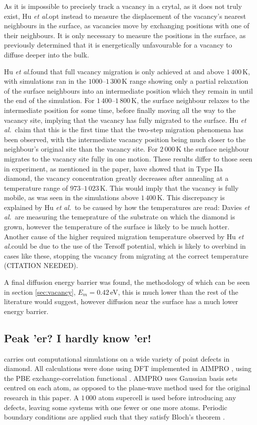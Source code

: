 \documentclass[10pt,a4paper,twocolumn,twoside]{extarticle}
\newcommand{\al}{\emph{et al.}}
\begin{document}
As it is impossible to precisely track a vacancy in a crytal, as it does not truly exist, Hu \al opt instead to measure the displacement of the vacancy's nearest neighbours in the surface, as vacancies move by exchanging positions with one of their neighbours. It is only necessary to measure the positions in the surface, as \textcite{Halicioglu} previously determined that it is energetically unfavourable for a vacancy to diffuse deeper into the bulk. 

Hu \al found that full vacancy migration is only achieved at and above $1\,400$\,K, with simulations ran in the $1000$--$1\,300$\,K range showing only a partial relaxation of the surface neighbours into an intermediate position which they remain in until the end of the simulation. For $1\,400$--$1\,800$\,K, the surface neighbour relaxes to the intermediate position for some time, before finally moving all the way to the vacancy site, implying that the vacancy has fully migrated to the surface. Hu \al~claim that this is the first time that the two-step migration phenomena has been observed, with the intermediate vacancy position being much closer to the neighbour's original site than the vacancy site. For $2\,000$\,K the surface neighbour migrates to the vacancy site fully in one motion. These results differ to those seen in experiment, as mentioned in the paper, \textcite{Davies} have showed that in Type IIa diamond, the vacancy concentration greatly decreases after annealing at a temperature range of $973$--$1\,023$\,K. This would imply that the vacancy is fully mobile, as was seen in the simulations above $1\,400$\,K. This discrepancy is explained by Hu \al~to be caused by how the temperatures are read: Davies \al~are measuring the temeprature of the substrate on which the diamond is grown, however the temperature of the surface is likely to be much hotter. Another cause of the higher required migration temperature observed by Hu \al could be due to the use of the Tersoff potential, which is likely to overbind in cases like these, stopping the vacancy from migrating at the correct temperature (CITATION NEEDED).

A final diffusion energy barrier was found, the methodology of which can be seen in section \ref{sec:vacancy}, $E_m = 0.42$\,eV, this is much lower than the rest of the literature would suggest, however diffusion near the surface has a much lower energy barrier.

\subsection{Peak 'er? I hardly know 'er!}
\textcite{Peaker} carries out computational simulations on a wide variety of point defects in diamond. All calculations were done using DFT implemented in AIMPRO \cite{AIMPRO}, using the PBE exchange-correlation functional \cite{PBE}. AIMPRO uses Gaussian basis sets centred on each atom, as opposed to the plane-wave method used for the original research in this paper. A $1\,000$ atom supercell is used before introducing any defects, leaving some systems with one fewer or one more atoms. Periodic boundary conditions are applied such that they satisfy Bloch's theorem \cite{Bloch}. 
\end{document}
